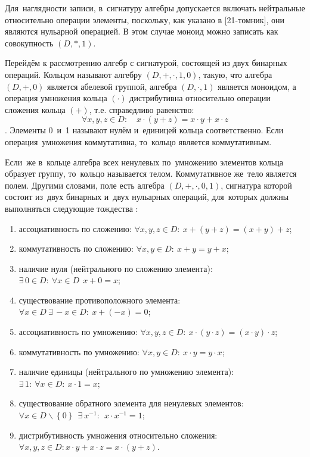 Для~наглядности записи, в~сигнатуру алгебры допускается включать нейтральные относительно операции элементы, поскольку, как указано в [21-томник], они являются нульарной операцией. В этом случае моноид можно записать как совокупность $\left( D,*,1 \right)$.

Перейдём к рассмотрению алгебр с сигнатурой, состоящей из двух бинарных операций. Кольцом называют алгебру $\left( D,+,\cdot ,1,0 \right)$, такую, что алгебра $\left( D,+,0 \right)$ является абелевой группой, алгебра $\left( D,\cdot ,1 \right)$ является моноидом, а операция умножения кольца $\left( \cdot  \right)$ дистрибутивна относительно операции сложения кольца $\left( + \right)$, т.е. справедливо равенство:
	\[\forall x,y,z\in D:\quad x\cdot \left( y+z \right)=x\cdot y+x\cdot z\].
Элементы 0~и~1 называют нулём и~единицей кольца соответственно. Если операция~умножения коммутативна, то~кольцо является коммутативным.

Если~же в~кольце алгебра всех ненулевых по~умножению элементов кольца образует группу, то~кольцо называется телом. Коммутативное же~тело является полем. Другими словами, поле есть алгебра $\left( D,+,\cdot ,0,1 \right)$, сигнатура которой состоит из~двух бинарных и~двух нульарных операций, для~которых должны выполняться следующие тождества \cite{Adelson_Velskiy, Bauman_DM, Yakhyaeva}:
\begin{enumerate}
	\item ассоциативность по сложению: $\forall x,y,z\in D:\ x+\left( y+z \right)=\left( x+y \right)+z$;
	\item коммутативность по сложению: $\forall x,y\in D:\ x+y=y+x$;
	\item наличие нуля (нейтрального по сложению элемента): $\exists \,0\in D:\ \forall x\in D\ \ x+0=x$;
	\item существование противоположного элемента:$\forall x\in D\ \exists \,-x\in D:\ x+\left( -x \right)=0$;
	\item ассоциативность по умножению: $\forall x,y,z\in D:\ x\cdot \left( y\cdot z \right)=\left( x\cdot y \right)\cdot z$;
	\item коммутативность по умножению: $\forall x,y\in D:\ x\cdot y=y\cdot x$;
	\item наличие единицы (нейтрального по умножению элемента): $\exists \,1:\ \forall x\in D:\ x\cdot 1=x$;
	\item существование обратного элемента для ненулевых элементов: $\forall x\in D\backslash \left\{ 0 \right\}\ \ \exists \ {{x}^{-1}}:\ \ x\cdot {{x}^{-1}}=1$;
	\item дистрибутивность умножения относительно сложения: $\forall x,y,z\in D:x\cdot y+x\cdot z=x\cdot \left( y+z \right)$.
\end{enumerate}

